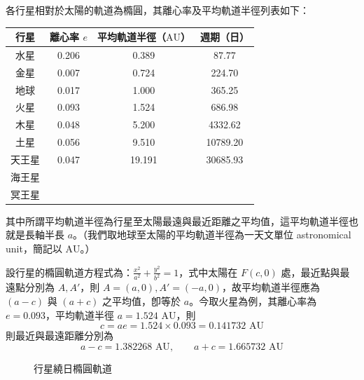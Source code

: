 \begin{example}
各行星相對於太陽的軌道為橢圓，其離心率及平均軌道半徑列表如下：
\begin{center}
\begin{tabular}{|c|c|c|c|}
\hline
行星 & 離心率 $e$ & 平均軌道半徑（$\text{AU}$） & 週期（日） \\ \hline
水星 & 0.206 & 0.389 & 87.77 \\ \hline
金星 & 0.007 & 0.724 & 224.70 \\ \hline
地球 & 0.017 & 1.000 & 365.25 \\ \hline
火星 & 0.093 & 1.524 & 686.98 \\ \hline
木星 & 0.048 & 5.200 & 4332.62 \\ \hline
土星 & 0.056 & 9.510 & 10789.20 \\ \hline
天王星 & 0.047 & 19.191 & 30685.93 \\ \hline
海王星 & & & \\ \hline
冥王星 & & & \\ \hline
\end{tabular}
\end{center}
其中所謂平均軌道半徑為行星至太陽最遠與最近距離之平均值，這平均軌道半徑也就是長軸半長 $a$。（我們取地球至太陽的平均軌道半徑為一天文單位 astronomical unit，簡記以 $\text{AU}$。）

設行星的橢圓軌道方程式為：$\frac{x^2}{a^2} + \frac{y^2}{b^2} = 1$，式中太陽在 $F(c,0)$ 處，最近點與最遠點分別為 $A, A'$，則 $A=(a,0), A'=(-a,0)$，故平均軌道半徑應為 $(a-c)$ 與 $(a+c)$ 之平均值，卽等於 $a$。今取火星為例，其離心率為 $e = 0.093$，平均軌道半徑 $a = 1.524\text{ AU}$，則
\[ c = ae = 1.524 \times 0.093 = 0.141732\text{ AU} \]
則最近與最遠距離分別為
\[ a - c = 1.382268\text{ AU}, \qquad a + c = 1.665732\text{ AU} \]

\begin{figure}[htbp]
\centering
{}
\caption{行星繞日橢圓軌道}
\label{fig:b4-3-7}
\end{figure}
\end{example}

